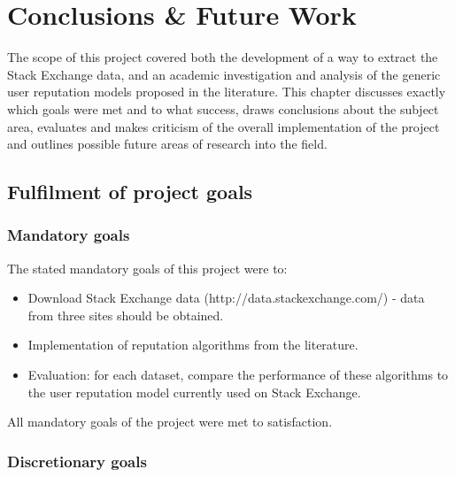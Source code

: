 \documentclass[]{final_report}
\begin{document}
\chapter{Conclusions \& Future Work}

The scope of this project covered both the development of a way to extract the Stack Exchange data, and an academic investigation and analysis of the generic user reputation models proposed in the literature. This chapter discusses exactly which goals were met and to what success, draws conclusions about the subject area, evaluates and makes criticism of the overall implementation of the project and outlines possible future areas of research into the field.

\section{Fulfilment of project goals}

\subsection{Mandatory goals}

The stated mandatory goals of this project were to:
\begin{itemize}
\item Download Stack Exchange data (http://data.stackexchange.com/) - data from three sites should be obtained.
\item Implementation of reputation algorithms from the literature.
\item Evaluation: for each dataset, compare the performance of these algorithms to the user reputation model currently used on Stack Exchange.
\end{itemize}

All mandatory goals of the project were met to satisfaction.

\subsection{Discretionary goals}
\end{document}
